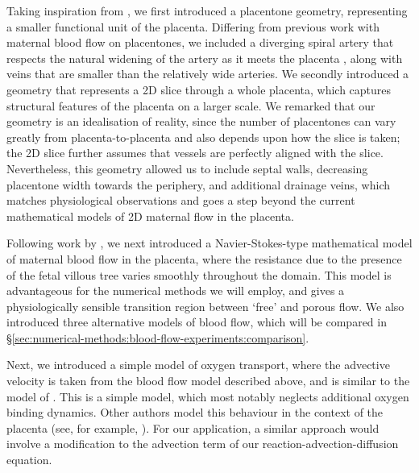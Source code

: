         Taking inspiration from \citeauthor{lecarpentierComputationalFluidDynamic2016} \cite{lecarpentierComputationalFluidDynamic2016}, we first introduced a placentone geometry, representing a smaller functional unit of the placenta. Differing from previous work with maternal blood flow on placentones, we included a diverging spiral artery that respects the natural widening of the artery as it meets the placenta \cite{burtonRheologicalPhysiologicalConsequences2009}, along with veins that are smaller than the relatively wide arteries. We secondly introduced a geometry that represents a 2D slice through a whole placenta, which captures structural features of the placenta on a larger scale. We remarked that our geometry is an idealisation of reality, since the number of placentones can vary greatly from placenta-to-placenta and also depends upon how the slice is taken; the 2D slice further assumes that vessels are perfectly aligned with the slice. Nevertheless, this geometry allowed us to include septal walls, decreasing placentone width towards the periphery, and additional drainage veins, which matches physiological observations and goes a step beyond the current mathematical models of 2D maternal flow in the placenta.

        Following work by \citeauthor{meklerImpactTissuePorosity2022} \cite{meklerImpactTissuePorosity2022}, we next introduced a Navier-Stokes-type mathematical model of maternal blood flow in the placenta, where the resistance due to the presence of the fetal villous tree varies smoothly throughout the domain. This model is advantageous for the numerical methods we will employ, and gives a physiologically sensible transition region between `free' and porous flow. We also introduced three alternative models of blood flow, which will be compared in \S\ref{sec:numerical-methods:blood-flow-experiments:comparison}.

        Next, we introduced a simple model of oxygen transport, where the advective velocity is taken from the blood flow model described above, and is similar to the model of \citeauthor{chernyavskyMathematicalModelIntervillous2010} \cite{chernyavskyMathematicalModelIntervillous2010}. This is a simple model, which most notably neglects additional oxygen binding dynamics. Other authors model this behaviour in the context of the placenta (see, for example, \cite{pearceImageBasedModelingBlood2016,serovOptimalVilliDensity2015,serovOptimalVilliDensity2015,erlichPhysicalGeometricDeterminants2019,meklerImpactTissuePorosity2022,serovOptimalVilliDensity2015}). For our application, a similar approach would involve a modification to the advection term of our reaction-advection-diffusion equation.

